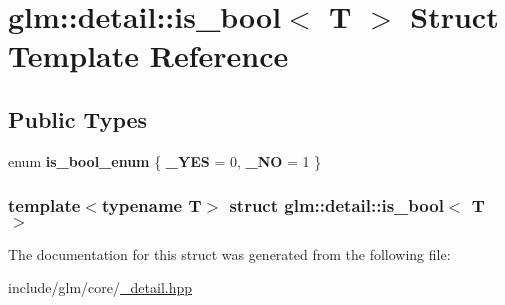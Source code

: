 \hypertarget{structglm_1_1detail_1_1is__bool}{\section{glm\-:\-:detail\-:\-:is\-\_\-bool$<$ \-T $>$ \-Struct \-Template \-Reference}
\label{structglm_1_1detail_1_1is__bool}
}
\subsection*{\-Public \-Types}
\begin{DoxyCompactItemize}
\item 
enum {\bfseries is\-\_\-bool\-\_\-enum} \{ {\bfseries \-\_\-\-Y\-E\-S} =  0, 
{\bfseries \-\_\-\-N\-O} =  1
 \}
\end{DoxyCompactItemize}
\subsubsection*{template$<$typename T$>$ struct glm\-::detail\-::is\-\_\-bool$<$ T $>$}



\-The documentation for this struct was generated from the following file\-:\begin{DoxyCompactItemize}
\item 
include/glm/core/\hyperlink{__detail_8hpp}{\-\_\-detail.\-hpp}\end{DoxyCompactItemize}

